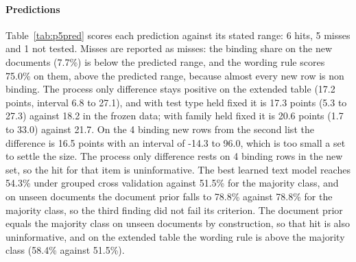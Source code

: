\documentclass[conference]{IEEEtran}
\begin{document}
\paragraph{Predictions} Table~\ref{tab:p5pred} scores each prediction against its stated range: 6 hits, 5 misses and 1 not tested. Misses are reported as misses: the binding share on the new documents (7.7\%) is below the predicted range, and the wording rule scores 75.0\% on them, above the predicted range, because almost every new row is non binding. The process only difference stays positive on the extended table (17.2 points, interval 6.8 to 27.1), and with test type held fixed it is 17.3 points (5.3 to 27.3) against 18.2 in the frozen data; with family held fixed it is 20.6 points (1.7 to 33.0) against 21.7. On the 4 binding new rows from the second list the difference is 16.5 points with an interval of -14.3 to 96.0, which is too small a set to settle the size. The process only difference rests on 4 binding rows in the new set, so the hit for that item is uninformative. The best learned text model reaches 54.3\% under grouped cross validation against 51.5\% for the majority class, and on unseen documents the document prior falls to 78.8\% against 78.8\% for the majority class, so the third finding did not fail its criterion. The document prior equals the majority class on unseen documents by construction, so that hit is also uninformative, and on the extended table the wording rule is above the majority class (58.4\% against 51.5\%).
\end{document}
